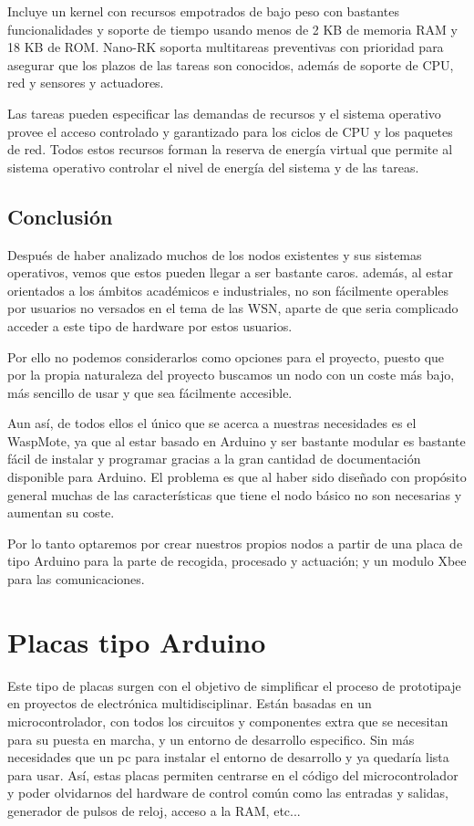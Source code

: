 Incluye un kernel con recursos empotrados de bajo peso con bastantes funcionalidades y soporte de tiempo usando menos de 2 KB de memoria RAM y 18 KB de ROM. Nano-RK soporta multitareas preventivas con prioridad para asegurar que los plazos de las tareas son conocidos, además de soporte de CPU, red y sensores y actuadores.



Las tareas pueden especificar las demandas de recursos y el sistema operativo provee el acceso controlado y garantizado para los ciclos de CPU y los paquetes de red. Todos estos recursos forman la reserva de energía virtual que permite al sistema operativo controlar el nivel de energía del sistema y de las tareas.



\subsection{Conclusión}
Después de haber analizado muchos de los nodos existentes y sus sistemas operativos, vemos que estos pueden llegar a ser bastante caros. además, al estar orientados a los ámbitos académicos e industriales, no son fácilmente operables por usuarios no versados en el tema de las WSN, aparte de que seria complicado acceder a este tipo de hardware por estos usuarios.



Por ello no podemos considerarlos como opciones para el proyecto, puesto que por la propia naturaleza del proyecto buscamos un nodo con un coste más bajo, más sencillo de usar y que sea fácilmente accesible.



Aun así, de todos ellos el único que se acerca a nuestras necesidades es el WaspMote, ya que al estar basado en Arduino y ser bastante modular es bastante fácil de instalar y programar gracias a la gran cantidad de documentación disponible para Arduino. El problema es que al haber sido diseñado con propósito general muchas de las características que tiene el nodo básico no son necesarias y aumentan su coste.



Por lo tanto optaremos por crear nuestros propios nodos a partir de una placa de tipo Arduino para la parte de recogida, procesado y actuación; y un modulo Xbee para las comunicaciones.



\section{Placas tipo Arduino}
Este tipo de placas surgen con el objetivo de simplificar el proceso de prototipaje en proyectos de electrónica multidisciplinar. Están basadas en un microcontrolador, con todos los circuitos y componentes extra que se necesitan para su puesta en marcha, y un entorno de desarrollo especifico. Sin más necesidades que un pc para instalar el entorno de desarrollo y ya quedaría lista para usar. Así, estas placas permiten centrarse en el código del microcontrolador y poder olvidarnos del hardware de control común como las entradas y salidas, generador de pulsos de reloj, acceso a la RAM, etc...




